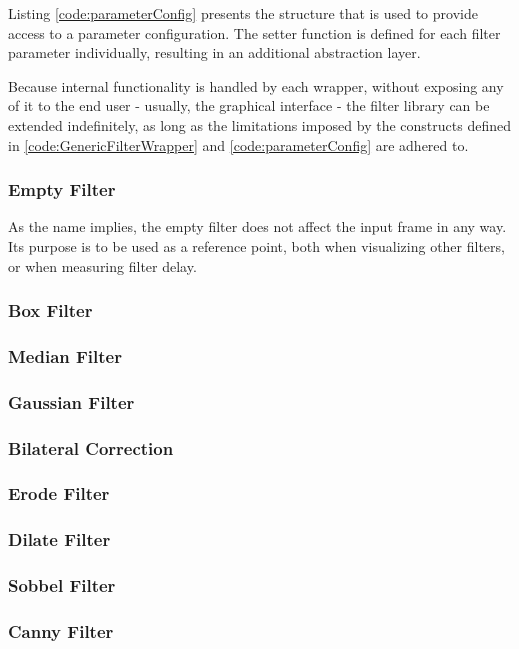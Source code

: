 Listing \ref{code:parameterConfig} presents the structure that is used to provide access to a parameter
configuration. The setter function is defined for each filter parameter individually, resulting in an
additional abstraction layer.

Because internal functionality is handled by each wrapper, without exposing any of it to the end
user - usually, the graphical interface - the filter library can be extended indefinitely, as long as
the limitations imposed by the constructs defined in \ref{code:GenericFilterWrapper} and 
\ref{code:parameterConfig} are adhered to.

\subsubsection{Empty Filter}

As the name implies, the empty filter does not affect the input frame in any way. Its purpose is to be
used as a reference point, both when visualizing other filters, or when measuring filter delay.

\subsubsection{Box Filter}
\subsubsection{Median Filter}
\subsubsection{Gaussian Filter}
\subsubsection{Bilateral Correction}
\subsubsection{Erode Filter}
\subsubsection{Dilate Filter}
\subsubsection{Sobbel Filter}
\subsubsection{Canny Filter}
